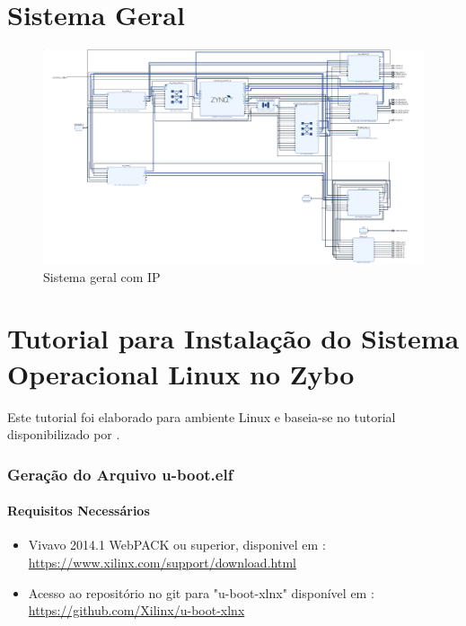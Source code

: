 \begin{anexosenv}

\partanexos

\chapter{Sistema Geral}
\begin{figure}[h]
	\centering
	\includegraphics[keepaspectratio=true,scale=0.32, angle=90]{figuras/base-zybo.png}
	\caption{Sistema geral com IP}
	\label{sitemageral}
\end{figure}



\chapter{Tutorial para Instalação do Sistema Operacional Linux no Zybo}

 Este tutorial foi elaborado para ambiente Linux e baseia-se no tutorial disponibilizado por \cite{tutorialzybo}.
 
 \subsection{Geração do Arquivo u-boot.elf}
 \subsubsection{Requisitos Necessários}
\begin{itemize}
\item Vivavo 2014.1 WebPACK ou superior, disponivel em : \url{https://www.xilinx.com/support/download.html}
\item Acesso ao repositório no git para "u-boot-xlnx" disponível em : \url{https://github.com/Xilinx/u-boot-xlnx} 


\end{itemize}
\end{anexosenv}

